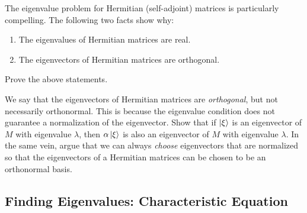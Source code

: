 \documentclass[12pt]{article}
\begin{document}
The eigenvalue problem for Hermitian (self-adjoint) matrices is particularly compelling. The following two facts show why:
\begin{enumerate}
    \item The eigenvalues of Hermitian matrices are real.
    \item The eigenvectors of Hermitian matrices are orthogonal.
\end{enumerate}

\begin{exercise}
Prove the above statements. 
\end{exercise}

\begin{exercise}\label{ex:orthogonal:eigenvectors:not:normal}
We say that the eigenvectors of Hermitian matrices are \emph{orthogonal}, but not necessarily orthonormal. This is because the eigenvalue condition does not guarantee a normalization of the eigenvector. Show that if $\left|\xi\right\rangle$ is an eigenvector of $M$ with eigenvalue $\lambda$, then $\alpha\left|\xi\right\rangle$ is also an eigenvector of $M$ with eigenvalue $\lambda$. In the same vein, argue that we can always \emph{choose} eigenvectors that are normalized so that the eigenvectors of a Hermitian matrices can be chosen to be an orthonormal basis.
\end{exercise}

\subsection{Finding Eigenvalues: Characteristic Equation}
\end{document}

